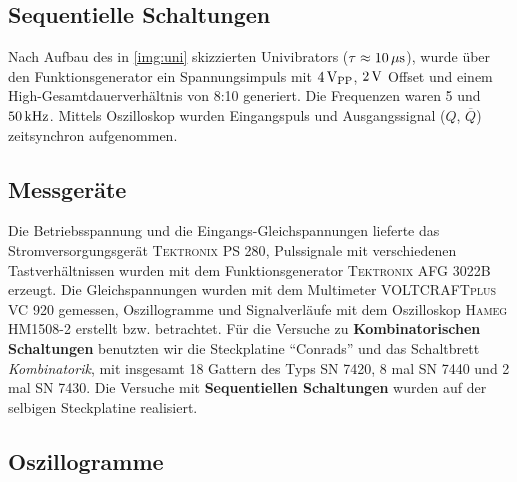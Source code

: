 \documentclass[numbers=noenddot,12pt,a4paper]{scrartcl}
\newcommand{\ix}[1]{_\text{#1}}
\newcommand{\nicht}[1]{\overline{#1}}
\begin{document}
\subsection{Sequentielle Schaltungen}
Nach Aufbau des in \ref{img:uni} skizzierten Univibrators ($\tau\approx\unit[10]{\mu s}$), wurde über den Funktionsgenerator ein Spannungsimpuls mit $\unit[4]{V\ix{PP}}$, $\unit[2]{V}$ Offset und einem High-Gesamtdauerverhältnis von 8:10 generiert. Die Frequenzen waren 5 und $\unit[50]{kHz}$. Mittels Oszilloskop wurden Eingangspuls und Ausgangssignal ($Q$, $\nicht{Q}$) zeitsynchron aufgenommen.
\subsection{Messgeräte}
Die Betriebsspannung und die Eingangs-Gleichspannungen lieferte das Stromversorgungsgerät \textsc{Tektronix PS 280}, Pulssignale mit verschiedenen Tastverhältnissen wurden mit dem Funktionsgenerator \textsc{Tektronix AFG 3022B} erzeugt. Die Gleichspannungen wurden mit dem Multimeter \textsc{VOLTCRAFTplus VC 920} gemessen, Oszillogramme und Signalverläufe mit dem Oszilloskop \textsc{Hameg HM1508-2} erstellt bzw. betrachtet. Für die Versuche zu \textbf{Kombinatorischen Schaltungen} benutzten wir die Steckplatine "`Conrads"' und das Schaltbrett \textit{Kombinatorik}, mit insgesamt 18 Gattern des Typs SN 7420, 8 mal SN 7440 und 2 mal SN 7430. Die Versuche mit \textbf{Sequentiellen Schaltungen} wurden auf der selbigen Steckplatine realisiert.
\subsection{Oszillogramme}
\end{document}
